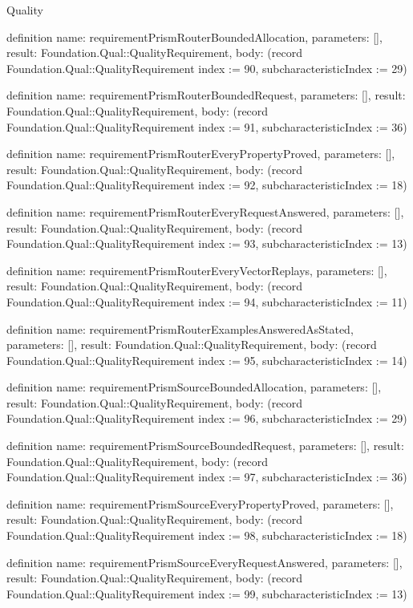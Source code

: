 \begin{lexlean}{Quality}
\begin{semanticmodule}
definition{
  name: requirementPrismRouterBoundedAllocation,
  parameters: [],
  result: Foundation.Qual::QualityRequirement,
  body: (record Foundation.Qual::QualityRequirement {index := 90, subcharacteristicIndex := 29})
}

definition{
  name: requirementPrismRouterBoundedRequest,
  parameters: [],
  result: Foundation.Qual::QualityRequirement,
  body: (record Foundation.Qual::QualityRequirement {index := 91, subcharacteristicIndex := 36})
}

definition{
  name: requirementPrismRouterEveryPropertyProved,
  parameters: [],
  result: Foundation.Qual::QualityRequirement,
  body: (record Foundation.Qual::QualityRequirement {index := 92, subcharacteristicIndex := 18})
}

definition{
  name: requirementPrismRouterEveryRequestAnswered,
  parameters: [],
  result: Foundation.Qual::QualityRequirement,
  body: (record Foundation.Qual::QualityRequirement {index := 93, subcharacteristicIndex := 13})
}

definition{
  name: requirementPrismRouterEveryVectorReplays,
  parameters: [],
  result: Foundation.Qual::QualityRequirement,
  body: (record Foundation.Qual::QualityRequirement {index := 94, subcharacteristicIndex := 11})
}

definition{
  name: requirementPrismRouterExamplesAnsweredAsStated,
  parameters: [],
  result: Foundation.Qual::QualityRequirement,
  body: (record Foundation.Qual::QualityRequirement {index := 95, subcharacteristicIndex := 14})
}

definition{
  name: requirementPrismSourceBoundedAllocation,
  parameters: [],
  result: Foundation.Qual::QualityRequirement,
  body: (record Foundation.Qual::QualityRequirement {index := 96, subcharacteristicIndex := 29})
}

definition{
  name: requirementPrismSourceBoundedRequest,
  parameters: [],
  result: Foundation.Qual::QualityRequirement,
  body: (record Foundation.Qual::QualityRequirement {index := 97, subcharacteristicIndex := 36})
}

definition{
  name: requirementPrismSourceEveryPropertyProved,
  parameters: [],
  result: Foundation.Qual::QualityRequirement,
  body: (record Foundation.Qual::QualityRequirement {index := 98, subcharacteristicIndex := 18})
}

definition{
  name: requirementPrismSourceEveryRequestAnswered,
  parameters: [],
  result: Foundation.Qual::QualityRequirement,
  body: (record Foundation.Qual::QualityRequirement {index := 99, subcharacteristicIndex := 13})
}


\end{semanticmodule}
\end{lexlean}
